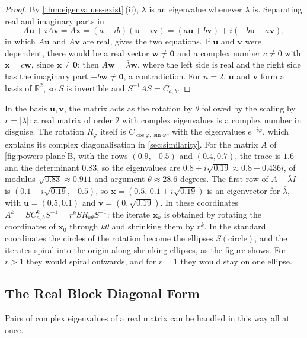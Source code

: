 \begin{proof}
By \cref{thm:eigenvalues-exist}\,(ii), $\bar\lambda$ is an eigenvalue whenever $\lambda$ is. Separating real and imaginary parts in
\[
A\mathbf u+iA\mathbf v=A\mathbf x=(a-ib)(\mathbf u+i\mathbf v)=(a\mathbf u+b\mathbf v)+i(-b\mathbf u+a\mathbf v),
\]
in which $A\mathbf u$ and $A\mathbf v$ are real, gives the two equations. If $\mathbf u$ and $\mathbf v$ were dependent, there would be a real vector $\mathbf w\ne\mathbf 0$ and a complex number $c\ne0$ with $\mathbf x=c\mathbf w$, since $\mathbf x\ne\mathbf 0$; then $A\mathbf w=\bar\lambda\mathbf w$, where the left side is real and the right side has the imaginary part $-b\mathbf w\ne\mathbf 0$, a contradiction. For $n=2$, $\mathbf u$ and $\mathbf v$ form a basis of $\mathbb R^2$, so $S$ is invertible and $S^{-1}AS=C_{a,b}$.
\end{proof}

In the basis $\mathbf u,\mathbf v$, the matrix acts as the rotation by $\theta$ followed by the scaling by $r=|\lambda|$: a real matrix of order $2$ with complex eigenvalues is a complex number in disguise. The rotation $R_\varphi$ itself is $C_{\cos\varphi,\sin\varphi}$, with the eigenvalues $e^{\pm i\varphi}$, which explains its complex diagonalisation in \cref{sec:similarity}. For the matrix $A$ of \cref{fig:powers-plane}B, with the rows $(0.9,-0.5)$ and $(0.4,0.7)$, the trace is $1.6$ and the determinant $0.83$, so the eigenvalues are $0.8\pm i\sqrt{0.19}\approx0.8\pm0.436i$, of modulus $\sqrt{0.83}\approx0.911$ and argument $\theta\approx28.6$ degrees. The first row of $A-\bar\lambda I$ is $(0.1+i\sqrt{0.19},-0.5)$, so $\mathbf x=(0.5,\,0.1+i\sqrt{0.19})$ is an eigenvector for $\bar\lambda$, with $\mathbf u=(0.5,0.1)$ and $\mathbf v=(0,\sqrt{0.19})$. In these coordinates $A^k=SC_{a,b}^kS^{-1}=r^kSR_{k\theta}S^{-1}$: the iterate $\mathbf x_k$ is obtained by rotating the coordinates of $\mathbf x_0$ through $k\theta$ and shrinking them by $r^k$. In the standard coordinates the circles of the rotation become the ellipses $S(\text{circle})$, and the iterates spiral into the origin along shrinking ellipses, as the figure shows. For $r>1$ they would spiral outwards, and for $r=1$ they would stay on one ellipse.

\subsection{The Real Block Diagonal Form}

Pairs of complex eigenvalues of a real matrix can be handled in this way all at once.

